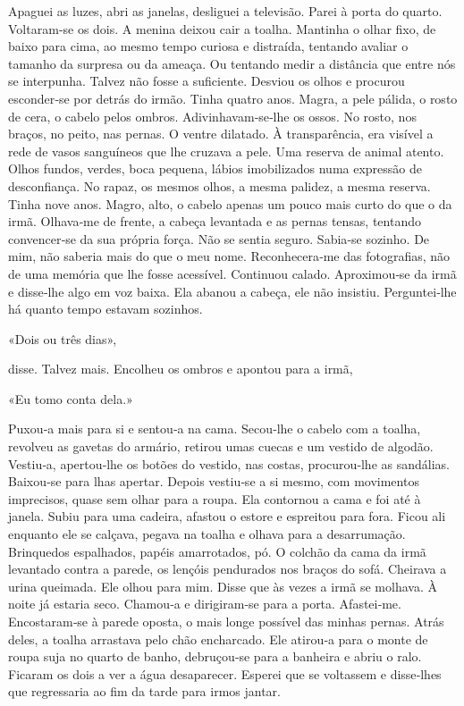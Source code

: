 Apaguei as luzes, abri as janelas, desliguei a televisão. Parei à porta
do quarto. Voltaram­‑se os dois. A menina deixou cair a toalha. Mantinha
o olhar fixo, de baixo para cima, ao mesmo tempo curiosa e distraída,
tentando avaliar o tamanho da surpresa ou da ameaça. Ou tentando medir a
distância que entre nós se interpunha. Talvez não fosse a suficiente.
Desviou os olhos e procurou esconder­‑se por detrás do irmão. Tinha
quatro anos. Magra, a pele pálida, o rosto de cera, o cabelo pelos
ombros. Adivinhavam­‑se­‑lhe os ossos. No rosto, nos braços, no peito,
nas pernas. O ventre dilatado. À transparência, era visível a rede de
vasos sanguíneos que lhe cruzava a pele. Uma reserva de animal atento.
Olhos fundos, verdes, boca pequena, lábios imobilizados numa expressão
de desconfiança. No rapaz, os mesmos olhos, a mesma palidez, a mesma
reserva. Tinha nove anos. Magro, alto, o cabelo apenas um pouco mais
curto do que o da irmã. Olhava­‑me de frente, a cabeça levantada e as
pernas tensas, tentando convencer­‑se da sua própria força. Não se
sentia seguro. Sabia­‑se sozinho. De mim, não saberia mais do que o meu
nome. Reconhecera­‑me das fotografias, não de uma memória que lhe fosse
acessível. Continuou calado. Aproximou­‑se da irmã e disse­‑lhe algo em
voz baixa. Ela abanou a cabeça, ele não insistiu. Perguntei­‑lhe há
quanto tempo estavam sozinhos.

«Dois ou três dias»,

disse. Talvez mais. Encolheu os ombros e apontou para a irmã,

«Eu tomo conta dela.»

Puxou­‑a mais para si e sentou­‑a na cama. Secou­‑lhe o cabelo com a
toalha, revolveu as gavetas do armário, retirou umas cuecas e um vestido
de algodão. Vestiu­‑a, apertou­‑lhe os botões do vestido, nas costas,
procurou­‑lhe as sandálias. Baixou­‑se para lhas apertar. Depois
vestiu­‑se a si mesmo, com movimentos imprecisos, quase sem olhar para a
roupa. Ela contornou a cama e foi até à janela. Subiu para uma cadeira,
afastou o estore e espreitou para fora. Ficou ali enquanto ele se
calçava, pegava na toalha e olhava para a desarrumação. Brinquedos
espalhados, papéis amarrotados, pó. O colchão da cama da irmã levantado
contra a parede, os lençóis pendurados nos braços do sofá. Cheirava a
urina queimada. Ele olhou para mim. Disse que às vezes a irmã se
molhava. À noite já estaria seco. Chamou­‑a e dirigiram­‑se para a
porta. Afastei­‑me. Encostaram­‑se à parede oposta, o mais longe
possível das minhas pernas. Atrás deles, a toalha arrastava pelo chão
encharcado. Ele atirou­‑a para o monte de roupa suja no quarto de banho,
debruçou­‑se para a banheira e abriu o ralo. Ficaram os dois a ver a
água desaparecer. Esperei que se voltassem e disse­‑lhes que regressaria
ao fim da tarde para irmos jantar.


